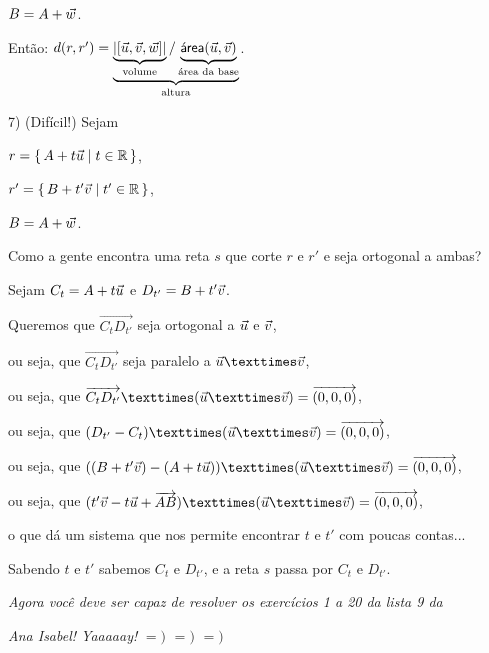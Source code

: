 \documentclass[oneside]{book}
\begin{document}
$B = A+{\vec w}$.

\def\ut#1#2{\underbrace{#1}_{\text{#2}}}

Então: $d(r,r') = \ut{\ut{|[\uu,\vv,\ww]|}{volume} / \ut{\area(\uu,\vv)}{área da base}}{altura}$.

7) (Difícil!) Sejam

$r  = \{\,A+t {\vec u}\;|\;t \in\mathbb{R}\,\}$,

$r' = \{\,B+t'{\vec v}\;|\;t'\in\mathbb{R}\,\}$,

$B = A+{\vec w}$.

Como a gente encontra uma reta $s$ que corte $r$ e $r'$ e seja ortogonal a ambas?

Sejam $C_t = A+t {\vec u}$ e $D_{t'} = B+t' {\vec v}$.

Queremos que $\Vec{C_tD_{t'}}$ seja ortogonal a ${\vec u}$ e ${\vec v}$,

ou seja, que $\Vec{C_tD_{t'}}$ seja paralelo a $\uu×\vv$,

ou seja, que $\Vec{C_tD_{t'}}×(\uu×\vv)=\V(0,0,0)$,

ou seja, que $(D_{t'}-C_t)×(\uu×\vv)=\V(0,0,0)$,

ou seja, que $((B+t'\vv)-(A+t \uu))×(\uu×\vv)=\V(0,0,0)$,

ou seja, que $(t'\vv - t\uu + \Vec{AB})×(\uu×\vv)=\V(0,0,0)$,

o que dá um sistema que nos permite encontrar $t$ e $t'$ com poucas contas...

Sabendo $t$ e $t'$ sabemos $C_t$ e $D_{t'}$, e a reta $s$ passa por $C_t$ e $D_{t'}$.

\bsk

{\sl Agora você deve ser capaz de resolver os exercícios 1 a 20 da lista 9 da}

{\sl Ana Isabel! Yaaaaay!} $=)$ $=)$ $=)$




\newpage


%                             

\mypsectionstex
\end{document}

